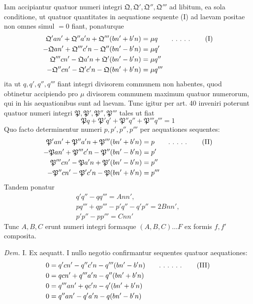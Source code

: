 Iam accipiantur quatuor numeri integri $\mathfrak{Q},\mathfrak{Q}',\mathfrak{Q}'',\mathfrak{Q}'''$ ad libitum, ea sola conditione, ut quatuor quantitates in aequatione sequente (I) ad laevam positae non omnes simul $=0$ fiant, ponaturque
\[
\begin{aligned}
\mathfrak{Q}'an'+\mathfrak{Q}''a'n+\mathfrak{Q}'''(bn'+b'n)&=\mu q\qquad\ldotp\,\ldotp\,\ldotp\,\ldotp\,\ldotp\qquad\text{(I)}\\
-\mathfrak{Q}an'+\mathfrak{Q}'''c'n-\mathfrak{Q}''(bn'-b'n)&=\mu q'\\
\mathfrak{Q}'''cn'-\mathfrak{Q}a'n+\mathfrak{Q}'(bn'-b'n)&=\mu q''\\
-\mathfrak{Q}''cn'-\mathfrak{Q}'c'n-\mathfrak{Q}(bn'+b'n)&=\mu q'''
\end{aligned}
\]
ita ut $q,q',q'',q'''$ fiant integri divisorem communem non habentes, quod obtinetur accipiendo pro $\mu$ divisorem communem maximum quatuor numerorum, qui in his aequationibus sunt ad laevam. Tunc igitur per art. 40 inveniri poterunt quatuor numeri integri $\mathfrak{P},\mathfrak{P}',\mathfrak{P}'',\mathfrak{P}'''$ tales ut fiat
\[
\mathfrak{P}q+\mathfrak{P}'q'+\mathfrak{P}''q''+\mathfrak{P}'''q'''=1
\]
Quo facto determinentur numeri $p,p',p'',p'''$ per aequationes sequentes:
\[
\begin{aligned}
\mathfrak{P}'an'+\mathfrak{P}''a'n+\mathfrak{P}'''(bn'+b'n)&=p\qquad\ldotp\,\ldotp\,\ldotp\,\ldotp\,\ldotp\qquad\text{(II)}\\
-\mathfrak{P}an'+\mathfrak{P}'''c'n-\mathfrak{P}''(bn'-b'n)&=p'\\
\mathfrak{P}'''cn'-\mathfrak{P}a'n+\mathfrak{P}'(bn'-b'n)&=p''\\
-\mathfrak{P}''cn'-\mathfrak{P}'c'n-\mathfrak{P}(bn'+b'n)&=p'''
\end{aligned}
\]
Tandem ponatur
\[
\begin{gathered}q'q''-qq'''=Ann',\\pq'''+qp'''-p'q''-q'p''=2Bnn',\\p'p''-pp'''=Cnn'\end{gathered}
\]
Tunc $A,B,C$ erunt numeri integri formaque $(A,B,C)\ldots F$ ex formis $f,f'$ composita.

\textit{Dem.} I. Ex aequatt. I nullo negotio confirmantur sequentes quatuor aequationes:
\[
\begin{aligned}
0&=q'cn'-q''c'n-q'''(bn'-b'n)\qquad\ldotp\,\ldotp\,\ldotp\,\ldotp\,\ldotp\,\ldotp\qquad\text{(III)}\\
0&=qcn'+q'''a'n-q''(bn'+b'n)\\
0&=q'''an'+qc'n-q'(bn'+b'n)\\
0&=q''an'-q'a'n-q(bn'-b'n)
\end{aligned}
\]

